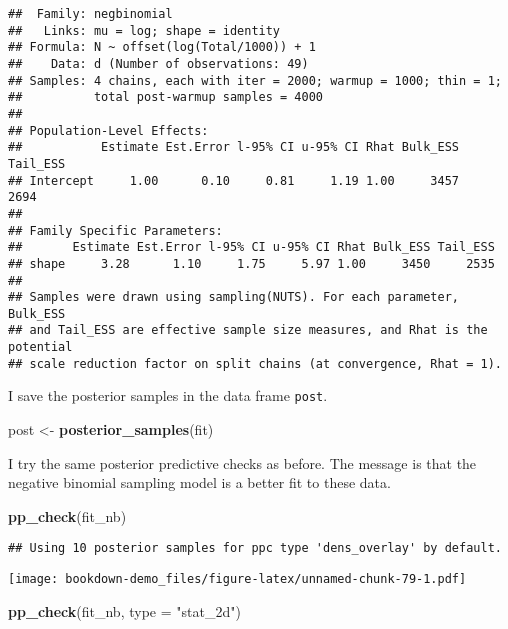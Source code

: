 \documentclass[
]{book}
\newenvironment{Shaded}{\begin{snugshade}}{\end{snugshade}}
\newcommand{\DataTypeTok}[1]{\textcolor[rgb]{0.13,0.29,0.53}{#1}}
\newcommand{\KeywordTok}[1]{\textcolor[rgb]{0.13,0.29,0.53}{\textbf{#1}}}
\newcommand{\NormalTok}[1]{#1}
\newcommand{\StringTok}[1]{\textcolor[rgb]{0.31,0.60,0.02}{#1}}
\begin{document}
\begin{verbatim}
##  Family: negbinomial 
##   Links: mu = log; shape = identity 
## Formula: N ~ offset(log(Total/1000)) + 1 
##    Data: d (Number of observations: 49) 
## Samples: 4 chains, each with iter = 2000; warmup = 1000; thin = 1;
##          total post-warmup samples = 4000
## 
## Population-Level Effects: 
##           Estimate Est.Error l-95% CI u-95% CI Rhat Bulk_ESS Tail_ESS
## Intercept     1.00      0.10     0.81     1.19 1.00     3457     2694
## 
## Family Specific Parameters: 
##       Estimate Est.Error l-95% CI u-95% CI Rhat Bulk_ESS Tail_ESS
## shape     3.28      1.10     1.75     5.97 1.00     3450     2535
## 
## Samples were drawn using sampling(NUTS). For each parameter, Bulk_ESS
## and Tail_ESS are effective sample size measures, and Rhat is the potential
## scale reduction factor on split chains (at convergence, Rhat = 1).
\end{verbatim}

I save the posterior samples in the data frame \texttt{post}.

\begin{Shaded}
\begin{Highlighting}[]
\NormalTok{post <-}\StringTok{ }\KeywordTok{posterior_samples}\NormalTok{(fit)}
\end{Highlighting}
\end{Shaded}

I try the same posterior predictive checks as before. The message is that the negative binomial sampling model is a better fit to these data.

\begin{Shaded}
\begin{Highlighting}[]
\KeywordTok{pp_check}\NormalTok{(fit_nb)}
\end{Highlighting}
\end{Shaded}

\begin{verbatim}
## Using 10 posterior samples for ppc type 'dens_overlay' by default.
\end{verbatim}

\texttt{[image: bookdown-demo\_files/figure-latex/unnamed-chunk-79-1.pdf]}

\begin{Shaded}
\begin{Highlighting}[]
\KeywordTok{pp_check}\NormalTok{(fit_nb, }\DataTypeTok{type =} \StringTok{"stat_2d"}\NormalTok{)}
\end{Highlighting}
\end{Shaded}
\end{document}
